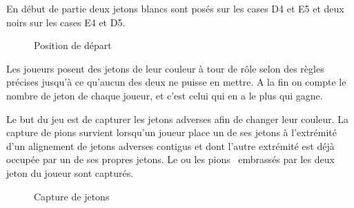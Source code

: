 \documentclass[11pt]{article}
\begin{document}
En début de partie deux jetons blancs sont posés sur les cases D4 et
E5 et deux noirs sur les cases E4 et D5.





\begin{figure}[h]
  \caption{Position de départ}
\end{figure}

Les joueurs posent des jetons de leur couleur à tour de rôle selon des
règles précises jusqu'à ce qu'aucun des deux ne puisse en mettre.
A la fin on compte le nombre de jeton de chaque joueur, et c'est celui qui en
a le plus qui gagne.

Le but du jeu est de capturer les jetons adverses afin de changer leur
couleur. La capture de pions survient lorsqu'un joueur place un de ses jetons
à l'extrémité d'un alignement de jetons adverses contigus et dont
l'autre extrémité est déjà occupée par un de ses propres
jetons. Le ou les pions \ embrassés par les deux jeton du joueur sont
capturés.


\begin{figure}[h]
  \caption {Capture de jetons}
  \begin{flushleft}
  \end{flushleft}
\end{figure}
\end{document}
